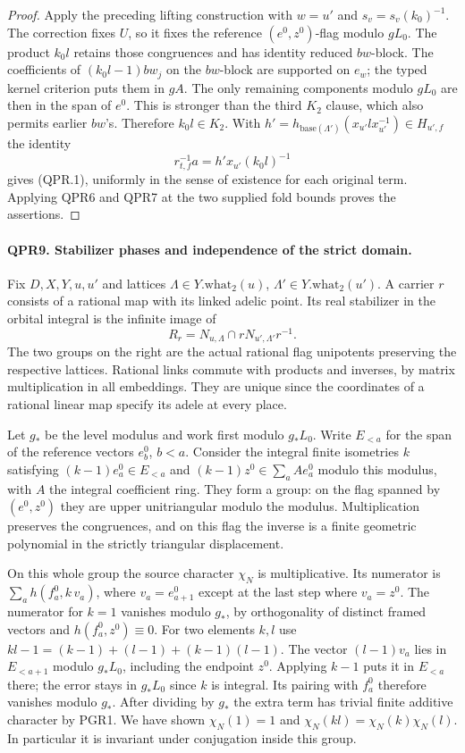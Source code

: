 \begin{proof}
Apply the preceding lifting construction with \(w=u'\) and
\(s_v=s_v(k_0)^{-1}\). The correction fixes \(U\), so it fixes
the reference \((e^0,z^0)\)-flag modulo \(gL_0\). The product
\(k_0l\) retains those congruences and has identity reduced
\(bw\)-block. The coefficients of \((k_0l-1)bw_j\) on the
\(bw\)-block are supported on \(e_w\); the typed kernel criterion
puts them in \(gA\). The only remaining components modulo \(gL_0\)
are then in the span of \(e^0\). This is stronger than the third
\(K_2\) clause, which also permits earlier \(bw\)'s.
Therefore \(k_0l\in K_2\). With \(h'=h_{\mathrm{base}(\Lambda')}
(x_{u'}l x_{u'}^{-1})\in H_{u',f}\) the identity
\[
        r_{t,f}^{-1}a=h'x_{u'}(k_0l)^{-1}
\]
gives (QPR.1), uniformly in the sense of existence for each
original term. Applying QPR6 and QPR7 at the two supplied fold
bounds proves the assertions.
\end{proof}
\paragraph{QPR9. Stabilizer phases and independence of the strict domain.}
Fix $D,X,Y,u,u'$ and lattices $\Lambda\in Y.\mathrm{what}_2(u)$,
$\Lambda'\in Y.\mathrm{what}_2(u')$. A carrier $r$ consists of a
rational map with its linked adelic point. Its real stabilizer in the
orbital integral is the infinite image of
\[
 R_r=N_{u,\Lambda}\cap rN_{u',\Lambda'}r^{-1}.
\]
The two groups on the right are the actual rational flag unipotents
preserving the respective lattices. Rational links commute with
products and inverses, by matrix multiplication in all embeddings.
They are unique since the coordinates of a rational linear map
specify its adele at every place.

Let $g_*$ be the level modulus and work first modulo $g_*L_0$.
Write $E_{<a}$ for the span of the reference vectors $e_b^0$, $b<a$.
Consider the integral finite isometries $k$ satisfying
$(k-1)e_a^0\in E_{<a}$ and $(k-1)z^0\in\sum_a A e_a^0$
modulo this modulus, with $A$ the integral coefficient ring.
They form a group: on the flag spanned by $(e^0,z^0)$ they are
upper unitriangular modulo the modulus. Multiplication preserves the
congruences, and on this flag the inverse is a finite geometric
polynomial in the strictly triangular displacement.

On this whole group the source character $\chi_N$ is multiplicative.
Its numerator is $\sum_a h(f_a^0,k\,v_a)$, where
$v_a=e_{a+1}^0$ except at the last step where $v_a=z^0$.
The numerator for $k=1$ vanishes modulo $g_*$, by orthogonality
of distinct framed vectors and $h(f_a^0,z^0)\equiv0$. For two
elements $k,l$ use
$kl-1=(k-1)+(l-1)+(k-1)(l-1)$. The vector $(l-1)v_a$
lies in $E_{<a+1}$ modulo $g_*L_0$, including the endpoint $z^0$.
Applying $k-1$ puts it in $E_{<a}$ there; the error stays in
$g_*L_0$ since $k$ is integral. Its pairing with $f_a^0$ therefore
vanishes modulo $g_*$. After dividing by $g_*$ the extra term has
trivial finite additive character by PGR1. We have shown
$\chi_N(1)=1$ and $\chi_N(kl)=\chi_N(k)\chi_N(l)$.
In particular it is invariant under conjugation inside this group.

